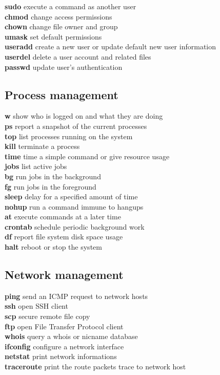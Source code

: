 \documentclass[11pt]{article}
\newcommand{\command}[2]{\textsf{\textbf{#1}} \dotfill{} #2}
\begin{document}
\begin{multicols*}{2}
\command{sudo}{execute a command as another user}\\
\command{chmod}{change access permissions}\\
\command{chown}{change file owner and group}\\
\command{umask}{set default permissions}\\
\command{useradd}{create a new user or update default new user information}\\
\command{userdel}{delete a user account and related files}\\
\command{passwd}{update user's authentication}

\subsection{Process management}

\command{w}{show who is logged on and what they are doing}\\
\command{ps}{report a snapshot of the current processes}\\
\command{top}{list processes running on the system}\\
\command{kill}{terminate a process}\\
\command{time}{time a simple command or give resource usage}\\
\command{jobs}{list active jobs}\\
\command{bg}{run jobs in the background}\\
\command{fg}{run jobs in the foreground}\\
\command{sleep}{delay for a specified amount of time}\\
\command{nohup}{run a command immune to hangups}\\
\command{at}{execute commands at a later time}\\
\command{crontab}{schedule periodic background work}\\
\command{df}{report file system disk space usage}\\
\command{halt}{reboot or stop the system}

\subsection{Network management}

\command{ping}{send an ICMP request to network hosts}\\
\command{ssh}{open SSH client}\\
\command{scp}{secure remote file copy}\\
\command{ftp}{open File Transfer Protocol client}\\
\command{whois}{query a whois or nicname database}\\
\command{ifconfig}{configure a network interface}\\
\command{netstat}{print network informations}\\
\command{traceroute}{print the route packets trace to network host}



\end{multicols*}
\end{document}
